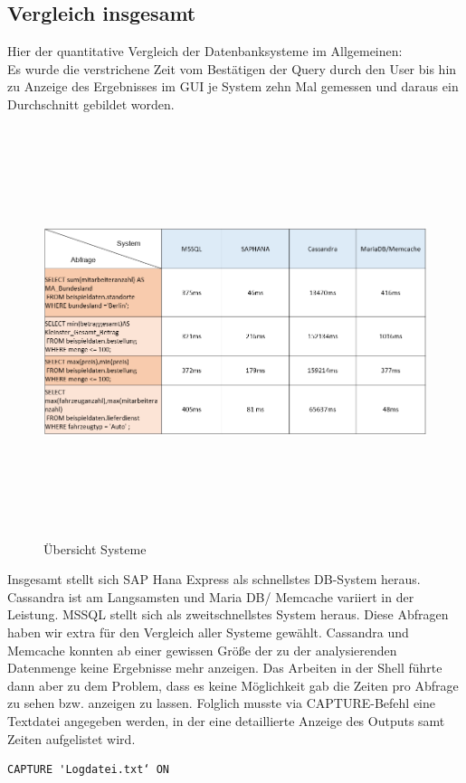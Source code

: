 \documentclass[a4paper, 12pt]{scrartcl}
\begin{document}
\subsection{Vergleich insgesamt}
Hier der quantitative Vergleich der Datenbanksysteme im Allgemeinen:\\
Es wurde die verstrichene Zeit vom Bestätigen der Query durch den User bis hin zu Anzeige des Ergebnisses im GUI je System zehn Mal gemessen und daraus ein Durchschnitt gebildet worden.

\begin{figure}[H]
\centering
\includegraphics[height=12cm, width=15cm, keepaspectratio]{ausw1.png}
\caption{Übersicht Systeme}
\end{figure}  

Insgesamt stellt sich SAP Hana Express als schnellstes DB-System heraus. Cassandra ist am Langsamsten und Maria DB/ Memcache variiert in der Leistung. MSSQL stellt sich als zweitschnellstes System heraus.
Diese Abfragen haben wir extra für den Vergleich aller Systeme gewählt. Cassandra und Memcache konnten ab einer gewissen Größe der zu der analysierenden Datenmenge keine Ergebnisse mehr anzeigen. 
Das Arbeiten in der Shell führte dann aber zu dem Problem, dass es keine Möglichkeit gab die Zeiten pro Abfrage zu sehen bzw. anzeigen zu lassen.
Folglich musste via CAPTURE-Befehl eine Textdatei angegeben werden, in der eine detaillierte Anzeige des Outputs samt Zeiten aufgelistet wird.
\begin{verbatim}
CAPTURE 'Logdatei.txt‘ ON
\end{verbatim}
\end{document}
